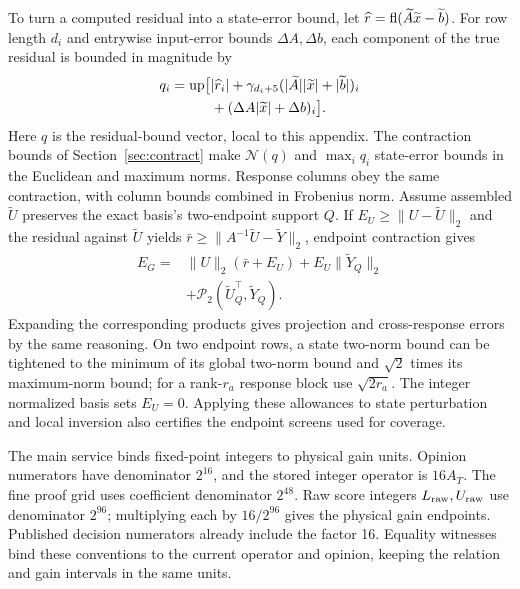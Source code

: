 To turn a computed residual into a state-error bound, let $\widehat r=\operatorname{fl}(\widetilde A\widetilde x-\widetilde b)$. For row length $d_i$ and entrywise input-error bounds $\Delta A,\Delta b$, each component of the true residual is bounded in magnitude by
\begin{equation}
 \begin{aligned}
 q_i=\operatorname{up}\!\big[&|\widehat r_i|+
 \gamma_{d_i+5}(|\widetilde A||\widetilde x|+|\widetilde b|)_i\\
 &+(\Delta A|\widetilde x|+\Delta b)_i\big].
 \end{aligned}
 \label{eq:residual}
\end{equation}
Here $q$ is the residual-bound vector, local to this appendix. The contraction bounds of Section~\ref{sec:contract} make $\mathcal N(q)$ and $\max_iq_i$ state-error bounds in the Euclidean and maximum norms. Response columns obey the same contraction, with column bounds combined in Frobenius norm. Assume assembled $\widetilde U$ preserves the exact basis's two-endpoint support $Q$. If $E_U\ge\|U-\widetilde U\|_2$ and the residual against $\widetilde U$ yields $\bar r\ge\|A^{-1}\widetilde U-\widetilde Y\|_2$, endpoint contraction gives
\begin{equation}
 \begin{aligned}
 E_G={}&\|U\|_2(\bar r+E_U)+E_U\|\widetilde Y_Q\|_2\\
 &+\mathcal P_2(\widetilde U_Q^\top,\widetilde Y_Q).
 \end{aligned}
 \label{eq:gram-error}
\end{equation}
Expanding the corresponding products gives projection and cross-response errors by the same reasoning. On two endpoint rows, a state two-norm bound can be tightened to the minimum of its global two-norm bound and $\sqrt2$ times its maximum-norm bound; for a rank-$r_a$ response block use $\sqrt{2r_a}$. The integer normalized basis sets $E_U=0$. Applying these allowances to state perturbation and local inversion also certifies the endpoint screens used for coverage.

The main service binds fixed-point integers to physical gain units. Opinion numerators have denominator $2^{16}$, and the stored integer operator is $16A_T$. The fine proof grid uses coefficient denominator $2^{48}$. Raw score integers $L_{\rm raw},U_{\rm raw}$ use denominator $2^{96}$; multiplying each by $16/2^{96}$ gives the physical gain endpoints. Published decision numerators already include the factor 16. Equality witnesses bind these conventions to the current operator and opinion, keeping the relation and gain intervals in the same units.


